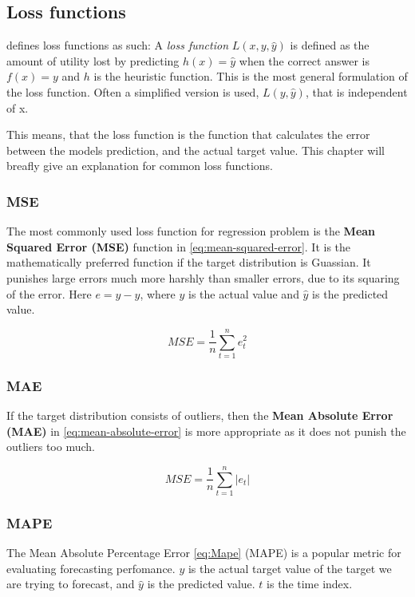 \subsection{Loss functions}
\label{section:BT:Loss}
\cite[p. 710-711]{Russel2012} defines loss functions as such:
A \textit{loss function} $L(x, y, \hat{y})$ is defined as the amount of utility lost by predicting
$h(x)=\hat{y}$ when the correct answer is $f(x) = y$ and $h$ is the heuristic function.
This is the most general formulation of the loss function. Often a simplified version is used,
$L(y, \hat{y})$, that is independent of x.

This means, that the loss function is the function that calculates the error between the
models prediction, and the actual target value.
This chapter will breafly give an explanation for common loss functions.


\subsubsection{MSE}
The most commonly used loss function for regression problem is the
\textbf{Mean Squared Error (MSE)} function in \autoref{eq:mean-squared-error}.
It is the mathematically preferred function if the target distribution is Guassian.
It punishes large errors much more harshly than smaller errors, due to its squaring of the error.
Here $e = y - \hat{y}$, where $y$ is the actual value and $\hat{y}$
is the predicted value.

\begin{equation}
  \label{eq:mean-squared-error}
  MSE = \frac{1}{n} \sum_{t=1}^n e_t^2
\end{equation}

\subsubsection{MAE}
If the target distribution consists of outliers, then the
\textbf{Mean Absolute Error (MAE)} in \autoref{eq:mean-absolute-error} is more appropriate
as it does not punish the outliers too much.

\begin{equation}
  \label{eq:mean-absolute-error}
  MSE = \frac{1}{n} \sum_{t=1}^n |e_t|
\end{equation}

\subsubsection{MAPE}
The Mean Absolute Percentage Error \autoref{eq:Mape} (MAPE)
is a popular metric for evaluating forecasting perfomance.
$y$ is the actual target value of the target we are trying to forecast, and $\hat{y}$ is the predicted value.
$t$ is the time index.

